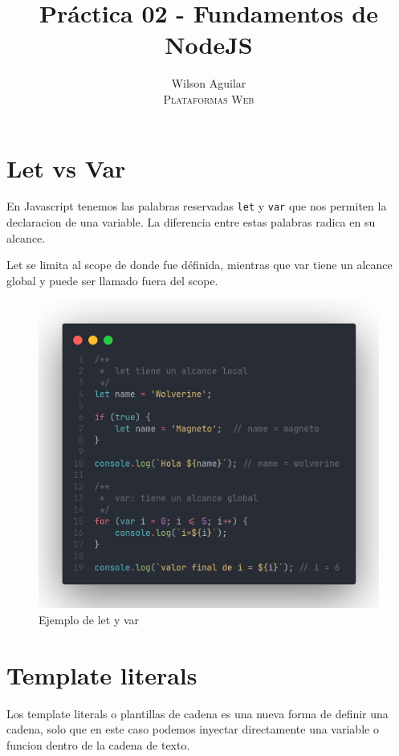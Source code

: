 \documentclass[12pt]{article}
\title{Práctica 02 - Fundamentos de NodeJS}
\author{ 
    Wilson Aguilar \\
    \textsc{Plataformas Web} 
}
\begin{document}
\maketitle

\section{Let vs Var}

En Javascript tenemos las palabras reservadas \lstinline{let} y \lstinline{var} que nos permiten la declaracion de una variable. La diferencia entre estas palabras radica en su alcance. 

Let se limita al scope de donde fue définida, mientras que var tiene un alcance global y puede ser llamado fuera del scope.

\begin{figure}[H]
	\centering
	\includegraphics[scale=.23]{assets/images/let-var.png}
	\caption{Ejemplo de let y var}
\end{figure}

\section{Template literals}

Los template literals o plantillas de cadena es una nueva forma de definir una cadena, solo que en este caso podemos inyectar directamente una variable o funcion dentro de la cadena de texto.
\end{document}
